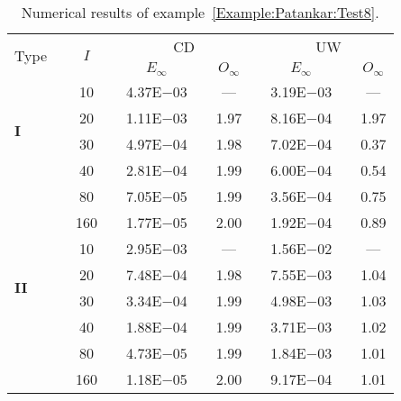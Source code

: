 {\renewcommand{\baselinestretch}{1.0}
\begin{table}[H]
\caption{Numerical results of example~\ref{Example:Patankar:Test8}.}

\setlength{\tabcolsep}{5pt}
\centering
\begin{tabular}{@{}l c c c c c c c c c c@{}}
\toprule
\multirow{2}{*}{Type} &  & \multirow{2}{*}{$I$} &  & \multicolumn{3}{c}{CD} &  & \multicolumn{3}{c}{UW} \\
\cline{5-7}
\cline{9-11}
 & & & & $E_{\infty}$ & & $O_{\infty}$ & & $E_{\infty}$ & & $O_{\infty}$\\
\midrule
\multirow{4}{*}{\textbf{I}} 
 & & 10 & & 4.37E$-$03 & & --- & & 3.19E$-$03 & & ---\\
 & & 20 & & 1.11E$-$03 & & 1.97 & & 8.16E$-$04 & & 1.97\\
 & & 30 & & 4.97E$-$04 & & 1.98 & & 7.02E$-$04 & & 0.37\\
 & & 40 & & 2.81E$-$04 & & 1.99 & & 6.00E$-$04 & & 0.54\\
 & & 80 & & 7.05E$-$05 & & 1.99 & & 3.56E$-$04 & & 0.75\\
 & & 160 & & 1.77E$-$05 & & 2.00 & & 1.92E$-$04 & & 0.89\\
\midrule
\multirow{4}{*}{\textbf{II}} 
 & & 10 & & 2.95E$-$03 & & --- & & 1.56E$-$02 & & ---\\
 & & 20 & & 7.48E$-$04 & & 1.98 & & 7.55E$-$03 & & 1.04\\
 & & 30 & & 3.34E$-$04 & & 1.99 & & 4.98E$-$03 & & 1.03\\
 & & 40 & & 1.88E$-$04 & & 1.99 & & 3.71E$-$03 & & 1.02\\
 & & 80 & & 4.73E$-$05 & & 1.99 & & 1.84E$-$03 & & 1.01\\
 & & 160 & & 1.18E$-$05 & & 2.00 & & 9.17E$-$04 & & 1.01\\
\bottomrule
\end{tabular}
\label{Table:Patankar:Test8}
\end{table}}
